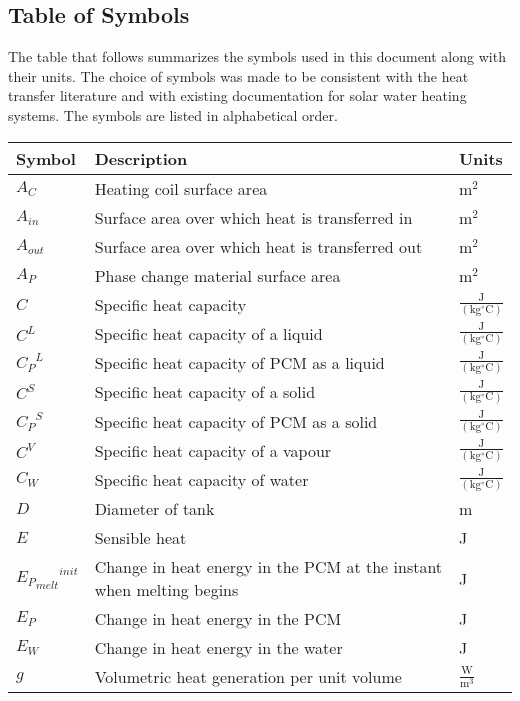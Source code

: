 \documentclass[12pt]{article}
\begin{document}
\subsection{Table of Symbols}
\label{Sec:ToS}
The table that follows summarizes the symbols used in this document along with their units. The choice of symbols was made to be consistent with the heat transfer literature and with existing documentation for solar water heating systems. The symbols are listed in alphabetical order.
\begin{longtabu}{l X[l] l}
\toprule
Symbol & Description & Units
\\
\midrule
${A_{C}}$ & Heating coil surface area & $\text{m}^{2}$
\\
${A_{in}}$ & Surface area over which heat is transferred in & $\text{m}^{2}$
\\
${A_{out}}$ & Surface area over which heat is transferred out & $\text{m}^{2}$
\\
${A_{P}}$ & Phase change material surface area & $\text{m}^{2}$
\\
$C$ & Specific heat capacity & $\frac{\text{J}}{(\text{kg}{}^{\circ}\text{C})}$
\\
${C^{L}}$ & Specific heat capacity of a liquid & $\frac{\text{J}}{(\text{kg}{}^{\circ}\text{C})}$
\\
${{C_{P}}^{L}}$ & Specific heat capacity of PCM as a liquid & $\frac{\text{J}}{(\text{kg}{}^{\circ}\text{C})}$
\\
${C^{S}}$ & Specific heat capacity of a solid & $\frac{\text{J}}{(\text{kg}{}^{\circ}\text{C})}$
\\
${{C_{P}}^{S}}$ & Specific heat capacity of PCM as a solid & $\frac{\text{J}}{(\text{kg}{}^{\circ}\text{C})}$
\\
${C^{V}}$ & Specific heat capacity of a vapour & $\frac{\text{J}}{(\text{kg}{}^{\circ}\text{C})}$
\\
${C_{W}}$ & Specific heat capacity of water & $\frac{\text{J}}{(\text{kg}{}^{\circ}\text{C})}$
\\
$D$ & Diameter of tank & m
\\
$E$ & Sensible heat & J
\\
${{{E_{P}}_{melt}}^{init}}$ & Change in heat energy in the PCM at the instant when melting begins & J
\\
${E_{P}}$ & Change in heat energy in the PCM & J
\\
${E_{W}}$ & Change in heat energy in the water & J
\\
$g$ & Volumetric heat generation per unit volume & $\frac{\text{W}}{\text{m}^{3}}$

\end{longtabu}
\end{document}
